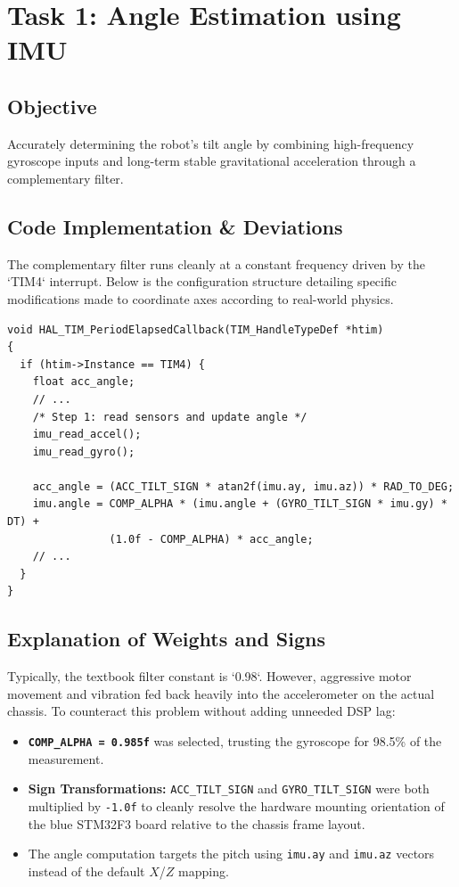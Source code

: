 \documentclass[12pt,a4paper]{article}
\begin{document}
\section{Task 1: Angle Estimation using IMU}

\subsection{Objective}
Accurately determining the robot's tilt angle by combining high-frequency gyroscope inputs and long-term stable gravitational acceleration through a complementary filter. 

\subsection{Code Implementation \& Deviations}

The complementary filter runs cleanly at a constant frequency driven by the `TIM4` interrupt. Below is the configuration structure detailing specific modifications made to coordinate axes according to real-world physics.

\begin{lstlisting}[caption=Complementary Filter Implementation (`main.c`)]
void HAL_TIM_PeriodElapsedCallback(TIM_HandleTypeDef *htim)
{
  if (htim->Instance == TIM4) {
    float acc_angle;
    // ...
    /* Step 1: read sensors and update angle */
    imu_read_accel();
    imu_read_gyro();

    acc_angle = (ACC_TILT_SIGN * atan2f(imu.ay, imu.az)) * RAD_TO_DEG;
    imu.angle = COMP_ALPHA * (imu.angle + (GYRO_TILT_SIGN * imu.gy) * DT) +
                (1.0f - COMP_ALPHA) * acc_angle;
    // ...
  }
}
\end{lstlisting}

\subsection{Explanation of Weights and Signs}

Typically, the textbook filter constant is `0.98`. However, aggressive motor movement and vibration fed back heavily into the accelerometer on the actual chassis. 
To counteract this problem without adding unneeded DSP lag:
\begin{itemize}
    \item \textbf{\texttt{COMP\_ALPHA = 0.985f}} was selected, trusting the gyroscope for 98.5\% of the measurement. 
    \item \textbf{Sign Transformations:} \texttt{ACC\_TILT\_SIGN} and \texttt{GYRO\_TILT\_SIGN} were both multiplied by \texttt{-1.0f} to cleanly resolve the hardware mounting orientation of the blue STM32F3 board relative to the chassis frame layout. 
    \item The angle computation targets the pitch using \texttt{imu.ay} and \texttt{imu.az} vectors instead of the default $X$/$Z$ mapping. 
\end{itemize}
\end{document}
